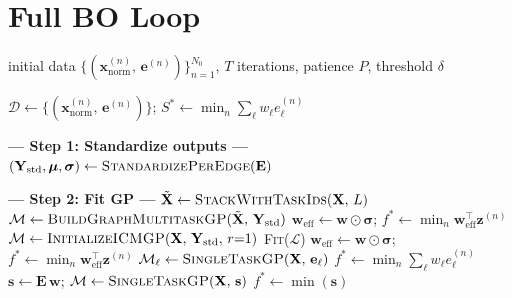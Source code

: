 \documentclass[11pt]{article}
\begin{document}
\section{Full BO Loop}

\begin{algorithm}[H]
\caption{\textsc{BayesianOptimizationLoop}}
\begin{algorithmic}[1]
\Require initial data $\{(\mathbf{x}^{(n)}_{\mathrm{norm}},\, \mathbf{e}^{(n)})\}_{n=1}^{N_0}$,
         $T$ iterations, patience $P$, threshold $\delta$

\State $\mathcal{D} \gets \{(\mathbf{x}^{(n)}_{\mathrm{norm}},\, \mathbf{e}^{(n)})\}$;\quad
       $S^* \gets \min_n \sum_\ell w_\ell e^{(n)}_\ell$


    \State \textbf{--- Step 1: Standardize outputs ---}
    \State $(\mathbf{Y}_{\mathrm{std}},\bm{\mu},\bm{\sigma}) \gets
           \textsc{StandardizePerEdge}(\mathbf{E})$

    \State \textbf{--- Step 2: Fit GP ---}
        \State $\tilde{\mathbf{X}} \gets \textsc{StackWithTaskIds}(\mathbf{X},\, L)$
        \Comment{$[NL, d+1]$}
        \State $\mathcal{M} \gets \textsc{BuildGraphMultitaskGP}(\tilde{\mathbf{X}},\,\mathbf{Y}_{\mathrm{std}})$
        \State $\mathbf{w}_{\mathrm{eff}} \gets \mathbf{w} \odot \bm{\sigma}$;\quad
               $f^* \gets \min_n \mathbf{w}_{\mathrm{eff}}^\top \mathbf{z}^{(n)}$
        \State $\mathcal{M} \gets \textsc{InitializeICMGP}(\mathbf{X},\,\mathbf{Y}_{\mathrm{std}},\,r{=}1)$
        \State \textsc{Fit}($\mathcal{L}$) 
        \State $\mathbf{w}_{\mathrm{eff}} \gets \mathbf{w} \odot \bm{\sigma}$;\quad
               $f^* \gets \min_n \mathbf{w}_{\mathrm{eff}}^\top \mathbf{z}^{(n)}$
            \State $\mathcal{M}_\ell \gets \textsc{SingleTaskGP}(\mathbf{X},\, \mathbf{e}_\ell)$
        \EndFor
        \State $f^* \gets \min_n \sum_\ell w_\ell e^{(n)}_\ell$
        \State $\mathbf{s} \gets \mathbf{E}\,\mathbf{w}$;\quad
               $\mathcal{M} \gets \textsc{SingleTaskGP}(\mathbf{X},\,\mathbf{s})$
        \State $f^* \gets \min(\mathbf{s})$
    \EndIf


\end{algorithmic}
\end{algorithm}
\end{document}

